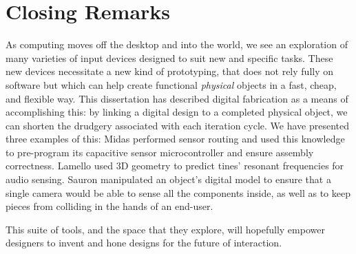 \section{Closing Remarks}

As computing moves off the desktop and into the world, we see an exploration of many varieties of input devices designed to suit new and specific tasks. These new devices necessitate a new kind of prototyping, that does not rely fully on software but which can help create functional \emph{physical} objects in a fast, cheap, and flexible way. This dissertation has described digital fabrication as a means of accomplishing this: by linking a digital design to a completed physical object, we can shorten the drudgery associated with each iteration cycle. We have presented three examples of this: Midas performed sensor routing and used this knowledge to pre-program its capacitive sensor microcontroller and ensure assembly correctness. Lamello used 3D geometry to predict tines’ resonant frequencies for audio sensing. Sauron manipulated an object’s digital model to ensure that a single camera would be able to sense all the components inside, as well as to keep pieces from colliding in the hands of an end-user.

This suite of tools, and the space that they explore, will hopefully empower designers to invent and hone designs for the future of interaction.
